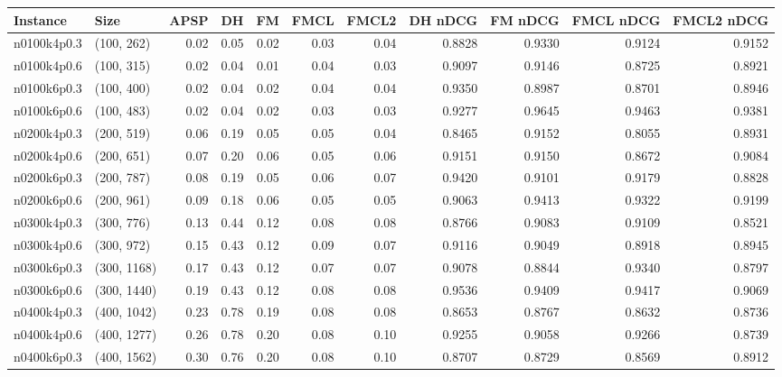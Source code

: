 \begin{tabular}{llrrrrrrrrr}
\toprule
   Instance &          Size &   APSP &     DH &    FM &  FMCL &  FMCL2 &  DH nDCG &  FM nDCG &  FMCL nDCG &  FMCL2 nDCG \\
\midrule
n0100k4p0.3 &    (100, 262) &   0.02 &   0.05 &  0.02 &  0.03 &   0.04 &   0.8828 &   0.9330 &     0.9124 &      0.9152 \\
n0100k4p0.6 &    (100, 315) &   0.02 &   0.04 &  0.01 &  0.04 &   0.03 &   0.9097 &   0.9146 &     0.8725 &      0.8921 \\
n0100k6p0.3 &    (100, 400) &   0.02 &   0.04 &  0.02 &  0.04 &   0.04 &   0.9350 &   0.8987 &     0.8701 &      0.8946 \\
n0100k6p0.6 &    (100, 483) &   0.02 &   0.04 &  0.02 &  0.03 &   0.03 &   0.9277 &   0.9645 &     0.9463 &      0.9381 \\
n0200k4p0.3 &    (200, 519) &   0.06 &   0.19 &  0.05 &  0.05 &   0.04 &   0.8465 &   0.9152 &     0.8055 &      0.8931 \\
n0200k4p0.6 &    (200, 651) &   0.07 &   0.20 &  0.06 &  0.05 &   0.06 &   0.9151 &   0.9150 &     0.8672 &      0.9084 \\
n0200k6p0.3 &    (200, 787) &   0.08 &   0.19 &  0.05 &  0.06 &   0.07 &   0.9420 &   0.9101 &     0.9179 &      0.8828 \\
n0200k6p0.6 &    (200, 961) &   0.09 &   0.18 &  0.06 &  0.05 &   0.05 &   0.9063 &   0.9413 &     0.9322 &      0.9199 \\
n0300k4p0.3 &    (300, 776) &   0.13 &   0.44 &  0.12 &  0.08 &   0.08 &   0.8766 &   0.9083 &     0.9109 &      0.8521 \\
n0300k4p0.6 &    (300, 972) &   0.15 &   0.43 &  0.12 &  0.09 &   0.07 &   0.9116 &   0.9049 &     0.8918 &      0.8945 \\
n0300k6p0.3 &   (300, 1168) &   0.17 &   0.43 &  0.12 &  0.07 &   0.07 &   0.9078 &   0.8844 &     0.9340 &      0.8797 \\
n0300k6p0.6 &   (300, 1440) &   0.19 &   0.43 &  0.12 &  0.08 &   0.08 &   0.9536 &   0.9409 &     0.9417 &      0.9069 \\
n0400k4p0.3 &   (400, 1042) &   0.23 &   0.78 &  0.19 &  0.08 &   0.08 &   0.8653 &   0.8767 &     0.8632 &      0.8736 \\
n0400k4p0.6 &   (400, 1277) &   0.26 &   0.78 &  0.20 &  0.08 &   0.10 &   0.9255 &   0.9058 &     0.9266 &      0.8739 \\
n0400k6p0.3 &   (400, 1562) &   0.30 &   0.76 &  0.20 &  0.08 &   0.10 &   0.8707 &   0.8729 &     0.8569 &      0.8912 \\

\end{tabular}
